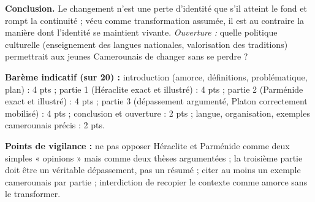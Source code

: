 \documentclass[11pt]{article}
\begin{document}
\begin{corrige}
\medskip
\textbf{Conclusion.} Le changement n'est une perte d'identité que s'il atteint le fond et rompt la continuité ; vécu comme transformation assumée, il est au contraire la manière dont l'identité se maintient vivante. \emph{Ouverture :} quelle politique culturelle (enseignement des langues nationales, valorisation des traditions) permettrait aux jeunes Camerounais de changer sans se perdre ?

\medskip
\textbf{Barème indicatif (sur 20) :} introduction (amorce, définitions, problématique, plan) : 4 pts ; partie 1 (Héraclite exact et illustré) : 4 pts ; partie 2 (Parménide exact et illustré) : 4 pts ; partie 3 (dépassement argumenté, Platon correctement mobilisé) : 4 pts ; conclusion et ouverture : 2 pts ; langue, organisation, exemples camerounais précis : 2 pts.

\medskip
\textbf{Points de vigilance :} ne pas opposer Héraclite et Parménide comme deux simples « opinions » mais comme deux thèses argumentées ; la troisième partie doit être un véritable dépassement, pas un résumé ; citer au moins un exemple camerounais par partie ; interdiction de recopier le contexte comme amorce sans le transformer.
\end{corrige}
\end{document}
